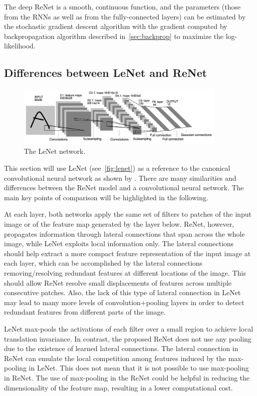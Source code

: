 The deep ReNet is a smooth, continuous function, and the parameters (those from
the RNNs as well as from the fully-connected layers) can be estimated by the
stochastic gradient descent algorithm with the gradient computed by
backpropagation algorithm described in~\autoref{sec:backprop} to maximize the
log-likelihood.

\subsection{Differences between LeNet and ReNet}\label{sec:lenetrenet}

\begin{figure}[t]
    \centering
    \includegraphics[width=0.9\textwidth]{img/renet/lenet5.jpg}
    \caption{The LeNet network.}
    \label{fig:lenet}
    \vspace{-3mm}
\end{figure}

This section will use LeNet (see~\autoref{fig:lenet}) as a reference to the
canonical convolutional neural network as shown by \citet{LeCun89}. There are
many similarities and differences between the ReNet model and a convolutional
neural network. The main key points of comparison will be highlighted in the
following.

At each layer, both networks apply the same set of filters to patches of the
input image or of the feature map generated by the layer below. ReNet, however,
propagates information through lateral connections that span across the whole
image, while LeNet exploits local information only. The lateral connections
should help extract a more compact feature representation of the input image at
each layer, which can be accomplished by the lateral connections
removing/resolving redundant features at different locations of the image. This
should allow ReNet resolve small displacements of features across multiple
consecutive patches. Also, the lack of this type of lateral connection in LeNet
may lead to many more levels of convolution+pooling layers in order to detect
redundant features from different parts of the image.

LeNet max-pools the activations of each filter over a small region to achieve
local translation invariance. In contrast, the proposed ReNet does not use any
pooling due to the existence of learned lateral connections. The lateral
connection in ReNet can emulate the local competition among features induced by
the max-pooling in LeNet.  This does not mean that it is not possible to use
max-pooling in ReNet. The use of max-pooling in the ReNet could be helpful in
reducing the dimensionality of the feature map, resulting in a lower
computational cost.

